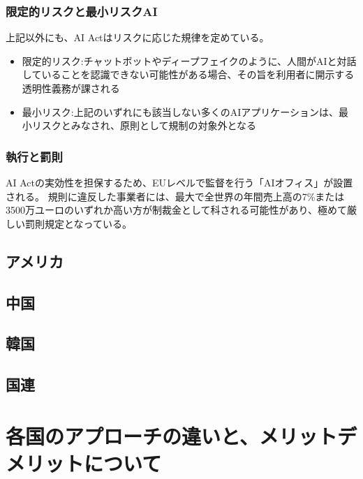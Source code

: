 \subsubsection{限定的リスクと最小リスクAI}

上記以外にも、AI Actはリスクに応じた規律を定めている。

\begin{itemize}
    \item 限定的リスク:チャットボットやディープフェイクのように、人間がAIと対話していることを認識できない可能性がある場合、その旨を利用者に開示する透明性義務が課される
    \item 最小リスク:上記のいずれにも該当しない多くのAIアプリケーションは、最小リスクとみなされ、原則として規制の対象外となる
\end{itemize}


\subsubsection{執行と罰則}

AI Actの実効性を担保するため、EUレベルで監督を行う「AIオフィス」が設置される。
規則に違反した事業者には、最大で全世界の年間売上高の7\%または3500万ユーロのいずれか高い方が制裁金として科される可能性があり、極めて厳しい罰則規定となっている。

\subsection{アメリカ}

\subsection{中国}

\subsection{韓国}

\subsection{国連}

\section{各国のアプローチの違いと、メリットデメリットについて}
